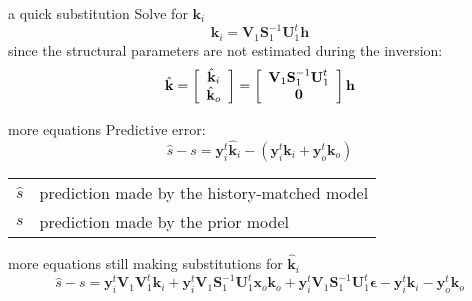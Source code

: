 \documentclass{beamer}
\begin{document}
\begin{frame}{a quick substitution}
Solve for $\textbf{k}_i$
\begin{equation*}
\textbf{k}_i = \textbf{V}_1\textbf{S}^{-1}_1\textbf{U}^t_1\textbf{h}
\end{equation*}
since the structural parameters are not estimated during the inversion:
\begin{equation*}
\hat{\bf{k}} = \left[\begin{array}{cc} \hat{\bf{k}}_i \\ \hat{\bf{k}}_o\end{array}\right] = 
\left[\begin{array}{cc}\textbf{V}_1\textbf{S}^{-1}_1\textbf{U}^t_1 \\ \textbf{0}\end{array} \right] \textbf{h}
\end{equation*}
\end{frame}

\begin{frame}{more equations}
Predictive error:
\begin{equation*}
\hat{s} - s = \textbf{y}^t_i\hat{\textbf{k}}_i - (\textbf{y}^t_i\textbf{k}_i + \textbf{y}^t_o\textbf{k}_o)
\end{equation*}

\begin{tabular}{ll}
{$\hat{s}$ }&prediction made by the history-matched model\\
$s$&prediction made by the prior model
\end{tabular}
\end{frame}

\begin{frame}{more equations still}
making substitutions for $\hat{\textbf{k}}_i$
\begin{equation*} 
\hat{s} - s =  \textbf{y}^t_i\textbf{V}_1\textbf{V}^t_1\textbf{k}_i + \textbf{y}^t_i\textbf{V}_1\textbf{S}^{-1}_1\textbf{U}^t_1\textbf{x}_o\textbf{k}_o + \textbf{y}^t_i\textbf{V}_1\textbf{S}^{-1}_1\textbf{U}^t_1\boldsymbol{\epsilon}  - \textbf{y}^t_i\textbf{k}_i - \textbf{y}^t_o\textbf{k}_o
\end{equation*}
\end{frame}
\end{document}
